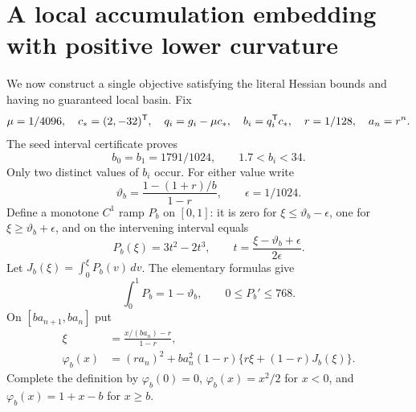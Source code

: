 \section{A local accumulation embedding with positive lower curvature}
We now construct a single objective satisfying the literal Hessian bounds and having no guaranteed local basin. Fix
\[
 \mu=1/4096,\quad c_*=(2,-32)^{\mathsf T},\quad
 q_i=g_i-\mu c_*,\quad b_i=q_i^{\mathsf T} c_*,\quad r=1/128,\quad a_n=r^n.
\]
The seed interval certificate proves
\[
 b_0=b_1=1791/1024,\qquad 1.7<b_i<34.
\]
Only two distinct values of $b_i$ occur. For either value write
\[
 \vartheta_b=\frac{1-(1+r)/b}{1-r},\qquad \epsilon=1/1024.
\]
Define a monotone $C^1$ ramp $P_b$ on $[0,1]$: it is zero for $\xi\le\vartheta_b-\epsilon$, one for $\xi\ge\vartheta_b+\epsilon$, and on the intervening interval equals
\[
 P_b(\xi)=3t^2-2t^3,\qquad t=\frac{\xi-\vartheta_b+\epsilon}{2\epsilon}.
\]
Let $J_b(\xi)=\int_0^\xi P_b(v)\,dv$. The elementary formulas give
\[
 \int_0^1P_b=1-\vartheta_b,\qquad 0\le P_b'\le768.
\]
On $[ba_{n+1},ba_n]$ put
\begin{align}
 \xi&=\frac{x/(ba_n)-r}{1-r},\\
 \varphi_b(x)&=(ra_n)^2+ba_n^2(1-r)
 \{r\xi+(1-r)J_b(\xi)\}.\label{L:eq:scalar}
\end{align}
Complete the definition by $\varphi_b(0)=0$, $\varphi_b(x)=x^2/2$ for $x<0$, and $\varphi_b(x)=1+x-b$ for $x\ge b$.

